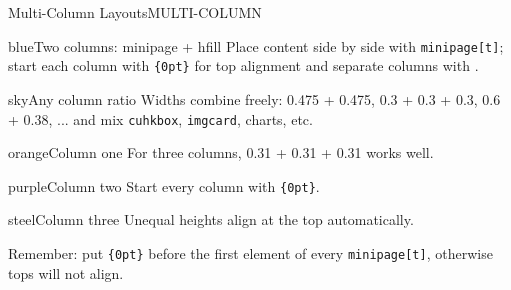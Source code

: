 \documentclass[10pt,aspectratio=169]{beamer}
\begin{document}
\begin{frame}{Multi-Column Layouts}{MULTI-COLUMN}
  \begin{minipage}[t]{0.475\textwidth}
    \vspace{0pt}%
    \begin{cuhkbox}{blue}{Two columns: minipage + hfill}
      {\footnotesize Place content side by side with
      \texttt{minipage[t]}; start each column with
      \texttt{\string\vspace\{0pt\}} for top alignment and
      separate columns with \texttt{\string\hfill}.}
    \end{cuhkbox}
  \end{minipage}\hfill
  \begin{minipage}[t]{0.475\textwidth}
    \vspace{0pt}%
    \begin{cuhkbox}{sky}{Any column ratio}
      {\footnotesize Widths combine freely:
      0.475 + 0.475, 0.3 + 0.3 + 0.3, 0.6 + 0.38, ...
      and mix \texttt{cuhkbox}, \texttt{imgcard}, charts, etc.}
    \end{cuhkbox}
  \end{minipage}
  \vspace{1.2mm}

  \begin{minipage}[t]{0.31\textwidth}
    \vspace{0pt}%
    \begin{cuhkbox}{orange}{Column one}
      {\footnotesize For three columns, 0.31 + 0.31 + 0.31 works well.}
    \end{cuhkbox}
  \end{minipage}\hfill
  \begin{minipage}[t]{0.31\textwidth}
    \vspace{0pt}%
    \begin{cuhkbox}{purple}{Column two}
      {\footnotesize Start every column with
      \texttt{\string\vspace\{0pt\}}.}
    \end{cuhkbox}
  \end{minipage}\hfill
  \begin{minipage}[t]{0.31\textwidth}
    \vspace{0pt}%
    \begin{cuhkbox}{steel}{Column three}
      {\footnotesize Unequal heights align at the top automatically.}
    \end{cuhkbox}
  \end{minipage}

  \begin{takeaway}
    Remember: put \texttt{\string\vspace\{0pt\}} before the first element of every
    \texttt{minipage[t]}, otherwise tops will not align.
  \end{takeaway}
\end{frame}
\end{document}

